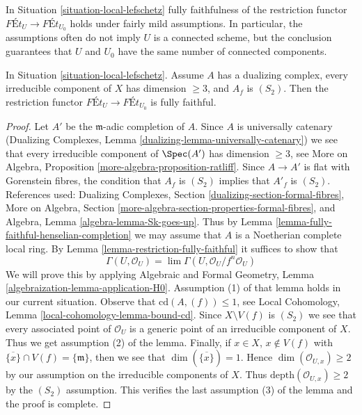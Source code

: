 \noindent
In Situation \ref{situation-local-lefschetz}
fully faithfulness of the restriction functor
$\textit{F\'Et}_U \longrightarrow \textit{F\'Et}_{U_0}$
holds under fairly mild assumptions.
In particular, the assumptions often do not imply
$U$ is a connected scheme, but the conclusion guarantees
that $U$ and $U_0$ have the same number of connected components.

\begin{lemma}
\label{lemma-fully-faithful-simple}
In Situation \ref{situation-local-lefschetz}. Assume
$A$ has a dualizing complex, every irreducible component
of $X$ has dimension $\geq 3$, and $A_f$ is $(S_2)$.
Then the restriction functor
$\textit{F\'Et}_U \longrightarrow \textit{F\'Et}_{U_0}$
is fully faithful.
\end{lemma}

\begin{proof}
Let $A'$ be the $\mathfrak m$-adic completion of $A$.
Since $A$ is universally catenary
(Dualizing Complexes, Lemma \ref{dualizing-lemma-universally-catenary})
we see that every irreducible component
of $\Spec(A')$ has dimension $\geq 3$, see
More on Algebra, Proposition \ref{more-algebra-proposition-ratliff}.
Since $A \to A'$ is flat with Gorenstein fibres,
the condition that $A_f$ is $(S_2)$ implies that $A'_f$ is $(S_2)$.
References used:
Dualizing Complexes, Section \ref{dualizing-section-formal-fibres},
More on Algebra, Section \ref{more-algebra-section-properties-formal-fibres},
and Algebra, Lemma \ref{algebra-lemma-Sk-goes-up}.
Thus by Lemma \ref{lemma-fully-faithful-henselian-completion}
we may assume that $A$ is a Noetherian complete local ring.
By Lemma \ref{lemma-restriction-fully-faithful}
it suffices to show that
$$
\Gamma(U, \mathcal{O}_U) = \lim \Gamma(U, \mathcal{O}_U/f^n\mathcal{O}_U)
$$
We will prove this by applying
Algebraic and Formal Geometry, Lemma \ref{algebraization-lemma-application-H0}.
Assumption (1) of that lemma holds in our current situation.
Observe that $\text{cd}(A, (f)) \leq 1$, see
Local Cohomology, Lemma \ref{local-cohomology-lemma-bound-cd}.
Since $X \setminus V(f)$ is $(S_2)$ we see that every associated
point of $\mathcal{O}_U$ is a generic point of an irreducible component
of $X$. Thus we get assumption (2) of the lemma.
Finally, if $x \in X$, $x \not \in V(f)$
with $\overline{\{x\}} \cap V(f) = \{\mathfrak m\}$,
then we see that $\dim(\overline{\{x\}}) = 1$.
Hence $\dim(\mathcal{O}_{U, x}) \geq 2$ by our assumption
on the irreducible components of $X$. Thus
$\text{depth}(\mathcal{O}_{U, x}) \geq 2$ by the $(S_2)$ assumption.
This verifies the last assumption (3) of the lemma and the proof
is complete.
\end{proof}



